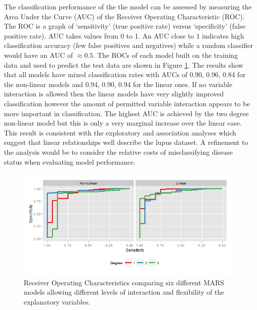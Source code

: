 \documentclass[a4paper, 12pt]{report}
\begin{document}
 The classification  performance of the the model can be assessed by measuring the Area Under the Curve (\gls{AUC}) of the Receiver Operating Characteristic (\gls{ROC}). The ROC is a graph of `sensitivity' (true positive rate) versus `specificity' (false positive rate). AUC takes values from 0 to 1. An AUC close to 1 indicates high classification accuracy (few false positives and negatives) while a random classifier would have an AUC of $\approx 0.5$. The ROCs of each model built on the training data and used to predict the test data are shown in Figure \ref{F:marsROC}. The results show that all models have mixed classification rates with AUCs of 0.90, 0.96, 0.84 for the non-linear models and 0.94, 0.90, 0.94 for the linear ones. If no variable interaction is allowed then the linear models have very slightly improved classification however the amount of permitted variable interaction appears to be more important in classification. The highest AUC is achieved by the two degree non-linear model but this is only a very marginal increase over the linear case. This result is consistent with the exploratory and association analyses which suggest that linear relationships well describe the lupus dataset. A refinement to the analysis would be to consider the relative costs of misclassifying disease status when evaluating model performance.



\begin{figure}[H]
\begin{centering}
\includegraphics[width=\textwidth]{marsROC.png}
\caption{Receiver Operating Characteristics comparing six different MARS models allowing different levels of interaction and flexibility of the explanatory variables.} 
\label{F:marsROC}
\end{centering}
\end{figure}
\end{document}
